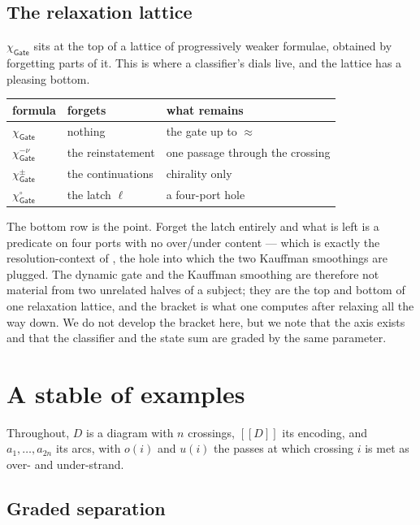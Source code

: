 \documentclass[11pt]{article}
\theoremstyle{definition}
\newcommand{\enc}[1]{[\![ #1 ]\!]}
\newcommand{\wbisim}{\approx}
\newcommand{\Gate}{\mathsf{Gate}}
\newcommand{\charf}[1]{\chi_{#1}}
\begin{document}
\subsection{The relaxation lattice}\label{sec:relax}

$\charf{\Gate}$ sits at the top of a lattice of progressively weaker formulae,
obtained by forgetting parts of it. This is where a classifier's dials live, and
the lattice has a pleasing bottom.

\begin{center}
\begin{tabular}{lll}
\hline
formula & forgets & what remains \\
\hline
$\charf{\Gate}$ & nothing & the gate up to $\wbisim$ \\
$\charf{\Gate}^{-\nu}$ & the reinstatement & one passage through the crossing \\
$\charf{\Gate}^{\pm}$ & the continuations & chirality only \\
$\charf{\Gate}^{\circ}$ & the latch $\ell$ & a four-port hole \\
\hline
\end{tabular}
\end{center}

The bottom row is the point. Forget the latch entirely and what is left is a
predicate on four ports with no over/under content --- which is exactly the
resolution-context of \cite[\S9]{knots}, the hole into which the two Kauffman
smoothings are plugged. The dynamic gate and the Kauffman smoothing are therefore
not material from two unrelated halves of a subject; they are the top and bottom
of one relaxation lattice, and the bracket is what one computes after relaxing all
the way down. We do not develop the bracket here, but we note that the axis exists
and that the classifier and the state sum are graded by the same parameter.

\section{A stable of examples}\label{sec:examples}

Throughout, $D$ is a diagram with $n$ crossings, $\enc{D}$ its encoding, and
$a_1,\dots,a_{2n}$ its arcs, with $o(i)$ and $u(i)$ the passes at which crossing
$i$ is met as over- and under-strand.

\subsection{Graded separation}\label{sec:sep}
\end{document}
